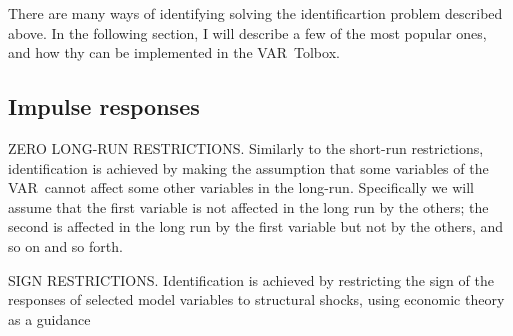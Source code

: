\documentclass[10pt]{article}
\begin{document}
There are many ways of identifying solving the identificartion problem
described above. In the following section, I will describe a few of the most
popular ones, and how thy can be implemented in the VAR\ Tolbox.

\subsection{Impulse responses}

ZERO LONG-RUN RESTRICTIONS. Similarly to the short-run restrictions,
identification is achieved by making the assumption that some variables of
the VAR\ cannot affect some other variables in the long-run. Specifically we
will assume that the first variable is not affected in the long run by the
others; the second is affected in the long run by the first variable but not
by the others, and so on and so forth.

SIGN RESTRICTIONS. Identification is achieved by restricting the sign of the
responses of selected model variables to structural shocks, using economic
theory as a guidance
\end{document}
